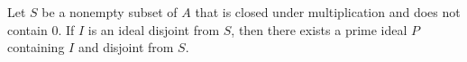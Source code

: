 Let $S$ be a nonempty subset of $A$ that is closed under multiplication and does not contain $0$. If $I$ is an ideal disjoint from $S$, then there exists a prime ideal $P$ containing $I$ and disjoint from $S$.
